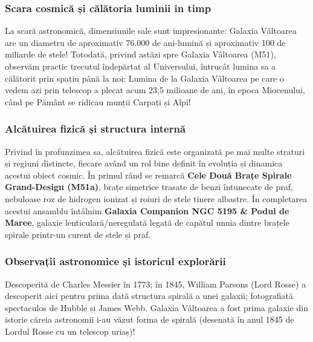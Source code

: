 \subsubsection*{Scara cosmică și călătoria luminii în timp}
La scară astronomică, dimensiunile sale sunt impresionante: Galaxia Vâltoarea are un diametru de aproximativ 76.000 de ani-lumină și aproximativ 100 de miliarde de stele! Totodată, privind astăzi spre Galaxia Vâltoarea (M51), observăm practic trecutul îndepărtat al Universului, întrucât lumina sa a călătorit prin spațiu până la noi: Lumina de la Galaxia Vâltoarea pe care o vedem azi prin telescop a plecat acum 23,5 milioane de ani, în epoca Miocenului, când pe Pământ se ridicau munții Carpați și Alpi!

\subsubsection*{Alcătuirea fizică și structura internă}
Privind în profunzimea sa, alcătuirea fizică este organizată pe mai multe straturi și regiuni distincte, fiecare având un rol bine definit în evoluția și dinamica acestui obiect cosmic. În primul rând se remarcă \textbf{Cele Două Brațe Spirale Grand-Design (M51a)}, brațe simetrice trasate de benzi întunecate de praf, nebuloase roz de hidrogen ionizat și roiuri de stele tinere albastre. În completarea acestui ansamblu întâlnim \textbf{Galaxia Companion NGC 5195 \& Podul de Maree}, galaxie lenticulară/neregulată legată de capătul unuia dintre brațele spirale printr-un curent de stele și praf.

\subsubsection*{Observații astronomice și istoricul explorării}
Descoperită de Charles Messier în 1773; în 1845, William Parsons (Lord Rosse) a descoperit aici pentru prima dată structura spirală a unei galaxii; fotografiată spectaculos de Hubble și James Webb. Galaxia Vâltoarea a fost prima galaxie din istorie căreia astronomii i-au văzut forma de spirală (desenată în anul 1845 de Lordul Rosse cu un telescop uriaș)!

